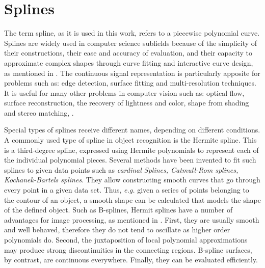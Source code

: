 \section{Splines}
\label{sec:splines}

The term spline, as it is used in this work, refers to a piecewise polynomial curve. Splines
are widely used in computer science subfields because of the simplicity of their constructions,
their ease and accuracy of evaluation, and their capacity to approximate complex shapes
through curve fitting and interactive curve design, as mentioned in \cite{web:splines}.
The continuous signal representation is particularly apposite for 
problems such as: edge detection, surface fitting and multi-resolution
techniques. It is useful for many other problems in computer
vision such as: optical flow, surface reconstruction, the recovery
of lightness and color, shape from shading and stereo matching,
\cite[821]{splinespap}.

Special types of splines receive different names, depending on different conditions.\\
A commonly used type of spline in object recognition is the Hermite spline. This is a third-degree spline, expressed using Hermite polynomials to represent each of the 
individual polynomial pieces. 
Several methods have been invented to fit such splines to given data points such
as \emph{cardinal Splines, Catmull-Rom splines, Kochanek-Bartels splines}. They allow constructing smooth curves that go through every point in a given data set. Thus, \emph{e.g.} 
given a series of points belonging to the contour of an object, a smooth shape can be 
calculated that models the shape of the defined object.  
Such as B-splines, Hermit splines have a number of advantages for image processing, as
mentioned in \cite{splinespap}.
First, they are usually smooth and well behaved, therefore they do not tend to oscillate
as higher order polynomials do. Second, the juxtaposition of local polynomial approximations
may produce strong discontinuities in the connecting regions. B-spline
surfaces, by contrast, are continuous everywhere. 
Finally, they can be evaluated efficiently.
